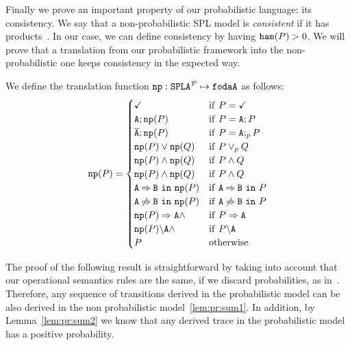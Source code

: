 


Finally we prove an important property of our probabilistic language: its consistency. We say that a non-probabilistic SPL model is \emph{consistent} if it has products~\cite{acl13}.  In our case, we can define consistency by having $\mathtt{ham}(P)>0$. We will prove that a translation from our probabilistic framework into the non-probabilistic one keeps consistency in the expected way.

\bdfn
  We define the translation function $\mathtt{np}:\mathtt{SPLA{^{\cal P}}}\mapsto \mathtt{fodaA}$ as follows:
  \begin{displaymath}
     \np(P)=
     \begin{cases}
       \checkmark & \mathrm{if}\ P=\checkmark\\
       \feature{A};\np(P) & \mathrm{if}\ P=\feature{A};P\\
       \ofeature{A};\np(P) & \mathrm{if}\ P=\feature{A};_pP\\
       \np(P) \choice \np(Q) & \mathrm{if}\ P \choice_{p} Q \\
       \np(P) \paral \np(Q) & \mathrm{if}\ P \paral Q \\
       \np(P) \paral \np(Q) & \mathrm{if}\ P \paral Q \\
       \require{A}{B}{\np(P)}  & \mathrm{if}\ \require{A}{B}{P}\\
       \exclude{A}{B}{\np(P)} & \mathrm{if}\ \exclude{A}{B}{P}\\
       \mandatory{A}{\np(P)} \paral & \mathrm{if}\ \mandatory{A}{P}\\
       \forbid{A}{\np(P)} \paral & \mathrm{if}\ \forbid{A}{P}\\
       P & \mathrm{otherwise}
     \end{cases}
  \end{displaymath}
\edfn

The proof of the following result is straightforward by taking into account that our operational semantics rules are the same, if we discard probabilities, as in~\cite{acl13}. Therefore, any sequence of transitions
derived in the probabilistic model can be also derived in the non probabilistic model~\ref{lem:pr:sum1}. In addition, by Lemma~\ref{lem:pr:sum2}  we know that any derived trace in the probabilistic model has a positive probability.

